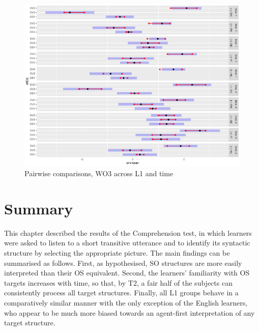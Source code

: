 \begin{figure}
    \includegraphics[width=\textwidth]{figures/05-9.pdf}
    \caption{Pairwise comparisons, WO3 across L1 and time}
    \label{fig:05:9}
\end{figure}

\section{Summary}\label{sec:05:3}

This chapter described the results of the Comprehension test, in which learners were asked to listen to a short transitive utterance and to identify its syntactic structure by selecting the appropriate picture. The main findings can be summarised as follows. First, as hypothesised, SO structures are more easily interpreted than their OS equivalent. Second, the learners' familiarity with OS targets increases with time, so that, by T2, a fair half of the subjects can consistently process all target structures. Finally, all L1 groups behave in a comparatively similar manner with the only exception of the English learners, who appear to be much more biased towards an agent-first interpretation of any target structure.
